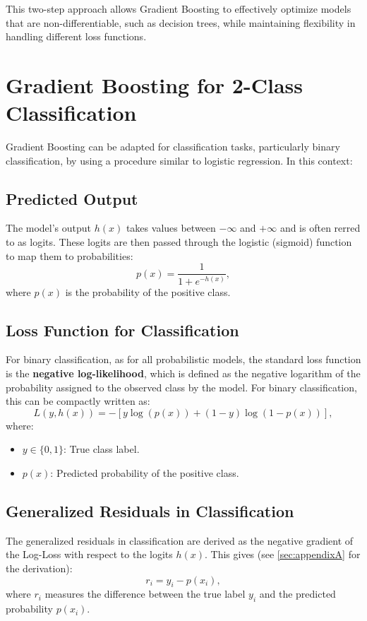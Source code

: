 \documentclass[12pt]{article}
\begin{document}
This two-step approach allows Gradient Boosting to effectively optimize models that are non-differentiable, such as decision trees, while maintaining flexibility in handling different loss functions.


\section*{Gradient Boosting for 2-Class Classification}
Gradient Boosting can be adapted for classification tasks, particularly binary classification, by using a procedure similar to logistic regression. In this context:

\subsection*{Predicted Output}
The model’s output \( h(x) \) takes values between \(-\infty\) and \(+\infty\) 
and is often rerred to as logits. These logits are then passed through the logistic (sigmoid) function to map them to probabilities:
\[
p(x) = \frac{1}{1 + e^{-h(x)}},
\]
where \( p(x) \) is the probability of the positive class.

\subsection*{Loss Function for Classification}
For binary classification, as for all probabilistic models, the standard loss function is the \textbf{negative log-likelihood}, which is defined as the negative logarithm of the probability assigned to the observed class by the model. For binary classification, this can be compactly written as:
\[
L(y, h(x)) = -\left[ y \log(p(x)) + (1-y) \log(1-p(x)) \right],
\]
where:
\begin{itemize}
    \item \( y \in \{0, 1\} \): True class label.
    \item \( p(x) \): Predicted probability of the positive class.
\end{itemize}

\subsection*{Generalized Residuals in Classification}
The generalized residuals in classification are derived as the negative gradient of the Log-Loss 
with respect to the logits \( h(x) \). This gives (see \cref{sec:appendixA} for the derivation):
\[
r_i = y_i - p(x_i),
\]
where \( r_i \) measures the difference between the true label \( y_i \) and the predicted probability \( p(x_i) \).
\end{document}
